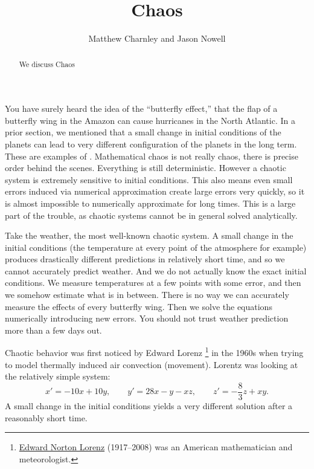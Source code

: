 \documentclass{ximera}
\title{Chaos}
\author{Matthew Charnley and Jason Nowell}
\begin{document}
\begin{abstract}
    We discuss Chaos
\end{abstract}
\maketitle

\label{sec:chaos}


You have surely heard the idea of the ``butterfly effect,'' that the flap of a butterfly wing in the Amazon can cause hurricanes in the North Atlantic.  In a prior section, we mentioned that a small change in initial conditions of the planets can lead to very different configuration of the planets in the long term.  These are examples of \emph{}. Mathematical chaos is not really chaos, there is precise order behind the scenes.  Everything is still deterministic.  However a chaotic system is extremely sensitive to initial conditions.  This also means even small errors induced  via numerical approximation create large errors very quickly, so it is almost impossible to numerically approximate for long times. This is a large part of the trouble, as chaotic systems cannot be in general solved analytically.

Take the weather, the most well-known chaotic system. A small change in the initial conditions (the temperature at every point of the atmosphere for example) produces drastically different predictions in relatively short time, and so we cannot accurately predict weather.  And we do not actually know the exact initial conditions.  We measure temperatures at a few points with some error, and then we somehow estimate what is in between. There is no way we can accurately measure the effects of every butterfly wing. Then we solve the equations numerically introducing new errors.  You should not trust weather prediction more than a few days out.

Chaotic behavior was first noticed by Edward Lorenz%
\footnote{
    \href{https://en.wikipedia.org/wiki/Edward_Norton_Lorenz}{Edward Norton Lorenz} (1917--2008) was an American mathematician and meteorologist.
    }
in the 1960s when trying to model thermally induced air convection (movement). Lorentz was looking at the relatively simple system:
\begin{equation*}
    x' = -10x +10y, \qquad y' = 28x-y-xz, \qquad z'=-\frac{8}{3}z + xy .
\end{equation*}
A small change in the initial conditions yields a very different solution after a reasonably short time. 
\end{document}
